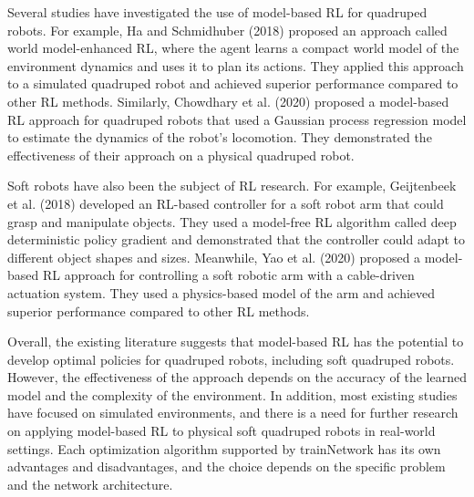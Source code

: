 Several studies have investigated the use of model-based RL for quadruped robots. For example, Ha and Schmidhuber (2018) proposed an approach called world model-enhanced RL, where the agent learns a compact world model of the environment dynamics and uses it to plan its actions. They applied this approach to a simulated quadruped robot and achieved superior performance compared to other RL methods. Similarly, Chowdhary et al. (2020) proposed a model-based RL approach for quadruped robots that used a Gaussian process regression model to estimate the dynamics of the robot's locomotion. They demonstrated the effectiveness of their approach on a physical quadruped robot.

Soft robots have also been the subject of RL research. For example, Geijtenbeek et al. (2018) developed an RL-based controller for a soft robot arm that could grasp and manipulate objects. They used a model-free RL algorithm called deep deterministic policy gradient and demonstrated that the controller could adapt to different object shapes and sizes. Meanwhile, Yao et al. (2020) proposed a model-based RL approach for controlling a soft robotic arm with a cable-driven actuation system. They used a physics-based model of the arm and achieved superior performance compared to other RL methods.

Overall, the existing literature suggests that model-based RL has the potential to develop optimal policies for quadruped robots, including soft quadruped robots. However, the effectiveness of the approach depends on the accuracy of the learned model and the complexity of the environment. In addition, most existing studies have focused on simulated environments, and there is a need for further research on applying model-based RL to physical soft quadruped robots in real-world settings.
Each optimization algorithm supported by trainNetwork has its own advantages and disadvantages, and the choice depends on the specific problem and the network architecture. 

